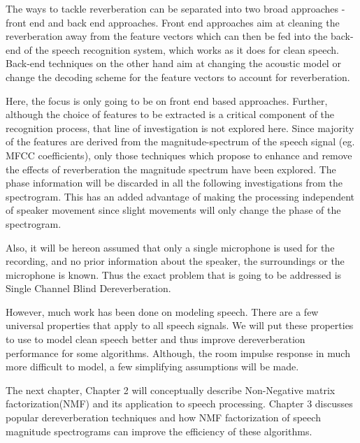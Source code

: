 The ways to tackle reverberation can be separated into two broad approaches - front end and back end approaches. Front end approaches aim at cleaning the reverberation away from the feature vectors which can then be fed into the back-end of the speech recognition system, which works as it does for clean speech. Back-end techniques on the other hand aim at changing the acoustic model or change the decoding scheme for the feature vectors to account for reverberation. 

Here, the focus is only going to be on front end based approaches. Further, although the choice of features to be extracted is a critical component of the recognition process, that line of investigation is not explored here. Since majority of the features are derived from the magnitude-spectrum of the speech signal (eg. MFCC coefficients), only those techniques which propose to enhance and remove the effects of reverberation the magnitude spectrum have been explored. The phase information will be discarded in all the following investigations from the spectrogram. This has an added advantage of making the processing independent of speaker movement  since slight movements will only change the phase of the spectrogram.

Also, it will be hereon assumed that only a single microphone is used for the recording, and no prior information about the speaker, the surroundings or the microphone is known. Thus the exact problem that is going to be addressed is Single Channel Blind Dereverberation. 

However, much work has been done on modeling speech. There are a few universal properties that apply to all speech signals. We will put these properties to use to model clean speech better and thus improve dereverberation performance for some algorithms. Although, the room impulse response in much more difficult to model, a few simplifying assumptions will be made.

The next chapter, Chapter 2 will conceptually describe Non-Negative matrix factorization(NMF) and its application to speech processing. Chapter 3 discusses popular dereverberation techniques and how NMF factorization of speech magnitude spectrograms can improve the efficiency of these algorithms. 








